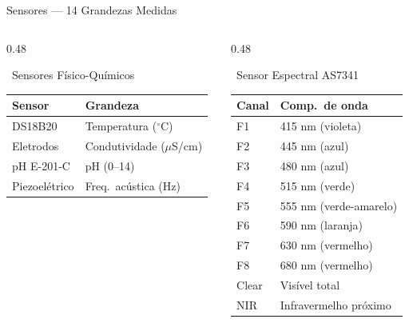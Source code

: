 \documentclass[aspectratio=169, 11pt]{beamer}
\begin{document}
\begin{frame}{Sensores — 14 Grandezas Medidas}
  \begin{columns}[T]
    \begin{column}{0.48\textwidth}
      \begin{block}{\faThermometerHalf\ Sensores Físico-Químicos}
        \begin{tabular}{ll}
          \toprule
          \textbf{Sensor} & \textbf{Grandeza} \\
          \midrule
          DS18B20     & Temperatura ($^\circ$C) \\
          Eletrodos   & Condutividade ($\mu$S/cm) \\
          pH E-201-C  & pH (0--14) \\
          Piezoelétrico & Freq.\ acústica (Hz) \\
          \bottomrule
        \end{tabular}
      \end{block}
    \end{column}
    \begin{column}{0.48\textwidth}
      \begin{block}{\faLightbulb\ Sensor Espectral AS7341}
        \begin{tabular}{ll}
          \toprule
          \textbf{Canal} & \textbf{Comp.\ de onda} \\
          \midrule
          F1 & 415 nm (violeta) \\
          F2 & 445 nm (azul) \\
          F3 & 480 nm (azul) \\
          F4 & 515 nm (verde) \\
          F5 & 555 nm (verde-amarelo) \\
          F6 & 590 nm (laranja) \\
          F7 & 630 nm (vermelho) \\
          F8 & 680 nm (vermelho) \\
          Clear & Visível total \\
          NIR & Infravermelho próximo \\
          \bottomrule
        \end{tabular}
      \end{block}
    \end{column}
  \end{columns}
\end{frame}
\end{document}
